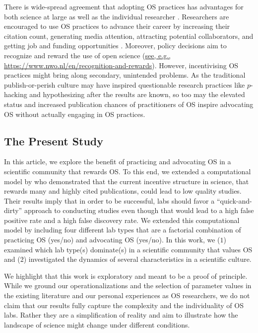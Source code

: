 \documentclass[meta, authordate]{jote-new-article}
\begin{document}
There is wide-spread agreement that adopting OS practices has advantages for both science at large as well as the individual researcher \parencites{AllenMehler2019}{mckiernan_how_2016}{markowetz_five_2015}. Researchers are encouraged to use OS practices to advance their career by increasing their citation count, generating media attention, attracting potential collaborators, and getting job and funding opportunities \parencites{mckiernan_how_2016}. Moreover, policy decisions aim to recognize and reward the use of open science (\href{https://www.nwo.nl/en/recognition-and-rewards}{see, e.g., https://www.nwo.nl/en/recognition-and-rewards}). However, incentivising OS practices might bring along secondary, unintended problems. As the traditional publish-or-perish culture may have inspired questionable research practices like $p$-hacking and hypothesizing after the results are known, so too may the elevated status and increased publication chances of practitioners of OS inspire advocating OS without actually engaging in OS practices.

\subsection{The Present Study}

In this article, we explore the benefit of practicing and advocating OS in a scientific community that rewards OS. To this end, we extended a computational model by \textcite{SmaldinoMcelreath2016} who demonstrated that the current incentive structure in science, that rewards many and highly cited publications, could lead to low quality studies. Their results imply that in order to be successful, labs should favor a ``quick-and-dirty'' approach to conducting studies even though that would lead to a high false positive rate and a high false discovery rate. We extended this computational model by including four different lab types that are a factorial combination of practicing OS (yes/no) and advocating OS (yes/no). In this work, we ($1$) examined which lab type(s) dominate(s) in a scientific community that values OS and ($2$) investigated the dynamics of several characteristics in a scientific culture.

We highlight that this work is exploratory and meant to be a proof of principle. While we ground our operationalizations and the selection of parameter values in the existing literature and our personal experiences as OS researchers, we do not claim that our results fully capture the complexity and the individuality of OS labs. Rather they are a simplification of reality and aim to illustrate how the landscape of science might change under different conditions.
\end{document}
